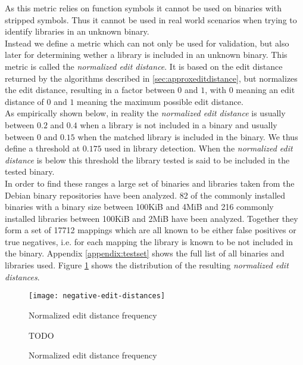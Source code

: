 \documentclass[
    12pt,                               %
    DIV=14,                     %
    parskip=half+,              %
    bigheadings,                %
    cleardoubleempty,   %
    halfparskip,                %
    ]{scrreprt} %
\begin{document}
As this metric relies on function symbols it cannot be used on binaries with stripped symbols. Thus it cannot be used in real world scenarios when trying to identify libraries in an unknown binary. \\
Instead we define a metric which can not only be used for validation, but also later for determining wether a library is included in an unknown binary. This metric is called the \textit{normalized edit distance}. It is based on the edit distance returned by the algorithms described in \ref{sec:approxeditdistance}, but normalizes the edit distance, resulting in a factor between $0$ and $1$, with $0$ meaning an edit distance of $0$ and $1$ meaning the maximum possible edit distance. \\ %
As empirically shown below, in reality the \textit{normalized edit distance} is usually between $0.2$ and $0.4$ when a library is not included in a binary and usually between $0$ and $0.15$ when the matched library is included in the binary. We thus define a threshold at $0.175$ used in library detection. When the \textit{normalized edit distance} is below this threshold the library tested is said to be included in the tested binary. \\
In order to find these ranges a large set of binaries and libraries taken from the Debian binary repositories have been analyzed. 82 of the commonly installed binaries with a binary size between 100KiB and 4MiB and 216 commonly installed libraries between 100KiB and 2MiB have been analyzed. Together they form a set of 17712 mappings which are all known to be either false positives or true negatives, i.e. for each mapping the library is known to be not included in the binary. Appendix \ref{appendix:testset} shows the full list of all binaries and libraries used. Figure \ref{fig:validation:negatives} shows the distribution of the resulting \textit{normalized edit distances}. \\

\begin{figure}[H]
	\centering
	\texttt{[image: negative-edit-distances]}
	\caption{Normalized edit distance frequency}
	\label{fig:validation:negatives}
\end{figure}

\begin{figure}[H]
	\centering
	TODO
	\caption{Normalized edit distance frequency}
	\label{fig:validation:positives}
\end{figure}

\end{document}
